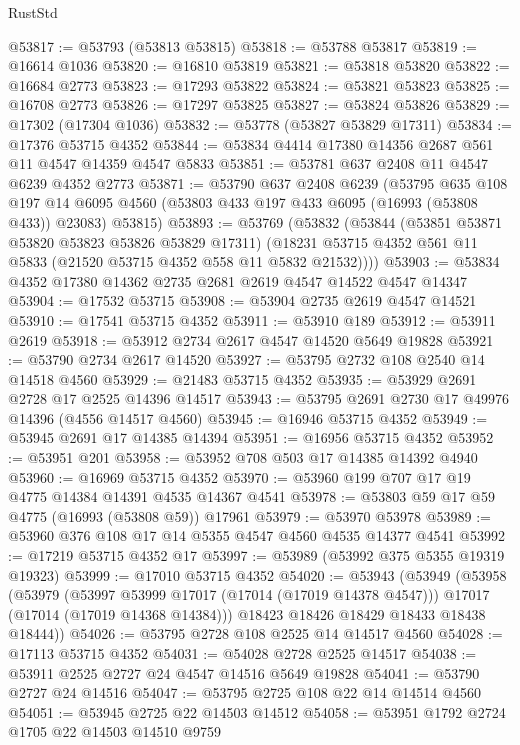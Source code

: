 \begin{lexlean}{RustStd}
\begin{coremodule}
{\begin{coremodule}
{{{{{{{{{{{{{{{{{{{{{{{{{{{{{{{{{{{{{{{{{{{{{{{{{{{{{{{@53817 := @53793 (@53813 @53815)
@53818 := @53788 @53817
@53819 := @16614 @1036
@53820 := @16810 @53819
@53821 := @53818 @53820
@53822 := @16684 @2773
@53823 := @17293 @53822
@53824 := @53821 @53823
@53825 := @16708 @2773
@53826 := @17297 @53825
@53827 := @53824 @53826
@53829 := @17302 (@17304 @1036)
@53832 := @53778 (@53827 @53829 @17311)
@53834 := @17376 @53715 @4352
@53844 := @53834 @4414 @17380 @14356 @2687 @561 @11 @4547 @14359 @4547 @5833
@53851 := @53781 @637 @2408 @11 @4547 @6239 @4352 @2773
@53871 := @53790
    @637
    @2408
    @6239
    (@53795
      @635
      @108
      @197
      @14
      @6095
      @4560
      (@53803 @433 @197 @433 @6095 (@16993 (@53808 @433)) @23083)
      @53815)
@53893 := @53769
    (@53832
      (@53844
        (@53851 @53871 @53820 @53823 @53826 @53829 @17311)
        (@18231 @53715 @4352 @561 @11 @5833 (@21520 @53715 @4352 @558 @11 @5832 @21532))))
@53903 := @53834 @4352 @17380 @14362 @2735 @2681 @2619 @4547 @14522 @4547 @14347
@53904 := @17532 @53715
@53908 := @53904 @2735 @2619 @4547 @14521
@53910 := @17541 @53715 @4352
@53911 := @53910 @189
@53912 := @53911 @2619
@53918 := @53912 @2734 @2617 @4547 @14520 @5649 @19828
@53921 := @53790 @2734 @2617 @14520
@53927 := @53795 @2732 @108 @2540 @14 @14518 @4560
@53929 := @21483 @53715 @4352
@53935 := @53929 @2691 @2728 @17 @2525 @14396 @14517
@53943 := @53795 @2691 @2730 @17 @49976 @14396 (@4556 @14517 @4560)
@53945 := @16946 @53715 @4352
@53949 := @53945 @2691 @17 @14385 @14394
@53951 := @16956 @53715 @4352
@53952 := @53951 @201
@53958 := @53952 @708 @503 @17 @14385 @14392 @4940
@53960 := @16969 @53715 @4352
@53970 := @53960 @199 @707 @17 @19 @4775 @14384 @14391 @4535 @14367 @4541
@53978 := @53803 @59 @17 @59 @4775 (@16993 (@53808 @59)) @17961
@53979 := @53970 @53978
@53989 := @53960 @376 @108 @17 @14 @5355 @4547 @4560 @4535 @14377 @4541
@53992 := @17219 @53715 @4352 @17
@53997 := @53989 (@53992 @375 @5355 @19319 @19323)
@53999 := @17010 @53715 @4352
@54020 := @53943
    (@53949
      (@53958
        (@53979
          (@53997 @53999 @17017 (@17014 (@17019 @14378 @4547)))
          @17017
          (@17014 (@17019 @14368 @14384)))
        @18423
        @18426
        @18429
        @18433
        @18438
        @18444))
@54026 := @53795 @2728 @108 @2525 @14 @14517 @4560
@54028 := @17113 @53715 @4352
@54031 := @54028 @2728 @2525 @14517
@54038 := @53911 @2525 @2727 @24 @4547 @14516 @5649 @19828
@54041 := @53790 @2727 @24 @14516
@54047 := @53795 @2725 @108 @22 @14 @14514 @4560
@54051 := @53945 @2725 @22 @14503 @14512
@54058 := @53951 @1792 @2724 @1705 @22 @14503 @14510 @9759
}}}}}}}}}}}}}}}}}}}}}}}}}}}}}}}}}}}}}}}}}}}}}}}}}}}}}}}
\end{coremodule}}
\end{coremodule}
\end{lexlean}
